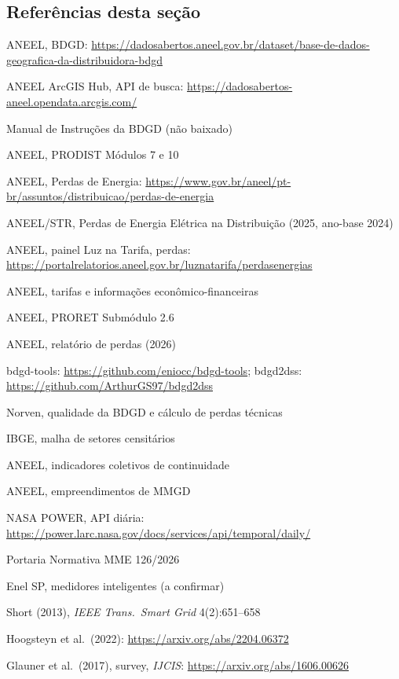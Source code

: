 \subsection*{Referências desta seção}
{\small
\begin{enumerate}[label={[\arabic*]},leftmargin=2.2em,itemsep=1pt]
\item ANEEL, BDGD: \url{https://dadosabertos.aneel.gov.br/dataset/base-de-dados-geografica-da-distribuidora-bdgd}
\item ANEEL ArcGIS Hub, API de busca: \url{https://dadosabertos-aneel.opendata.arcgis.com/}
\item Manual de Instruções da BDGD (não baixado)
\item ANEEL, PRODIST Módulos 7 e 10
\item ANEEL, Perdas de Energia: \url{https://www.gov.br/aneel/pt-br/assuntos/distribuicao/perdas-de-energia}
\item ANEEL/STR, Perdas de Energia Elétrica na Distribuição (2025, ano-base 2024)
\item ANEEL, painel Luz na Tarifa, perdas: \url{https://portalrelatorios.aneel.gov.br/luznatarifa/perdasenergias}
\item ANEEL, tarifas e informações econômico-financeiras
\item ANEEL, PRORET Submódulo 2.6
\item ANEEL, relatório de perdas (2026)
\item bdgd-tools: \url{https://github.com/eniocc/bdgd-tools}; bdgd2dss: \url{https://github.com/ArthurGS97/bdgd2dss}
\item Norven, qualidade da BDGD e cálculo de perdas técnicas
\item IBGE, malha de setores censitários
\item ANEEL, indicadores coletivos de continuidade
\item ANEEL, empreendimentos de MMGD
\item NASA POWER, API diária: \url{https://power.larc.nasa.gov/docs/services/api/temporal/daily/}
\item Portaria Normativa MME 126/2026
\item Enel SP, medidores inteligentes (a confirmar)
\item Short (2013), \emph{IEEE Trans.\ Smart Grid} 4(2):651--658
\item Hoogsteyn et al.\ (2022): \url{https://arxiv.org/abs/2204.06372}
\item Glauner et al.\ (2017), survey, \emph{IJCIS}: \url{https://arxiv.org/abs/1606.00626}

\end{enumerate}}
